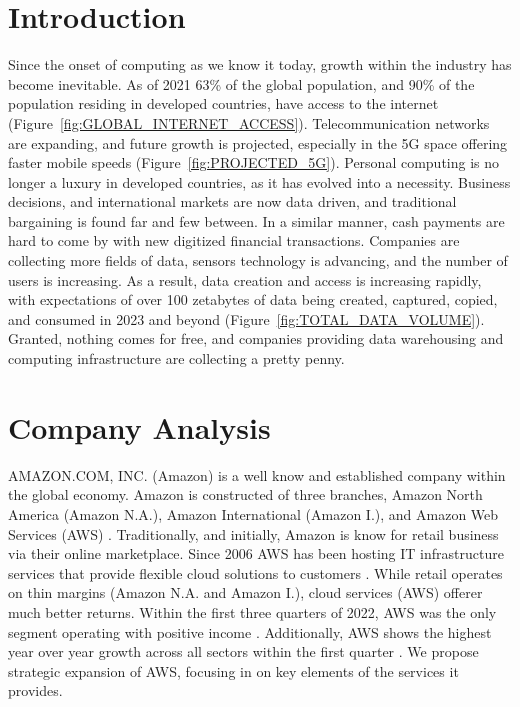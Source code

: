 \documentclass[a4paper, 12pt]{article}
\begin{document}
\newpage

\tableofcontents
\newpage

\section{Introduction}
Since the onset of computing as we know it today, growth within the industry has become inevitable.
As of 2021 63\% of the global population, and 90\% of the population residing in developed countries, have access to the internet (Figure~\ref{fig:GLOBAL_INTERNET_ACCESS}).
Telecommunication networks are expanding, and future growth is projected, especially in the 5G space offering faster mobile speeds (Figure~\ref{fig:PROJECTED_5G}).
Personal computing is no longer a luxury in developed countries, as it has evolved into a necessity.
Business decisions, and international markets are now data driven, and traditional bargaining is found far and few between.
In a similar manner, cash payments are hard to come by with new digitized financial transactions.
Companies are collecting more fields of data, sensors technology is advancing, and the number of users is increasing.
As a result, data creation and access is increasing rapidly, with expectations of over 100 zetabytes of data being created, captured, copied, and consumed in 2023 and beyond (Figure~\ref{fig:TOTAL_DATA_VOLUME}).
Granted, nothing comes for free, and companies providing data warehousing and computing infrastructure are collecting a pretty penny.

\section{Company Analysis}

AMAZON.COM, INC. (Amazon) is a well know and established company within the global economy.
Amazon is constructed of three branches, Amazon North America (Amazon N.A.), Amazon International (Amazon I.), and Amazon Web Services (AWS) \cite[p.~22]{AMZN_10K_2021}.
Traditionally, and initially, Amazon is know for retail business via their online marketplace.
Since 2006 AWS has been hosting IT infrastructure services that provide flexible cloud solutions to customers \cite{AMZN_ABOUT_AWS}.
While retail operates on thin margins (Amazon N.A. and Amazon I.), cloud services (AWS) offerer much better returns.
Within the first three quarters of 2022, AWS was the only segment operating with positive income \cite[p.~24, p.~19, p.~19]{AMZN_10Q_Q1_2022, AMZN_10Q_Q2_2022, AMZN_10Q_Q3_2022}.
Additionally, AWS shows the highest year over year growth across all sectors within the first quarter \cite[p.~23, p.~24, p.~24]{AMZN_10Q_Q1_2022, AMZN_10Q_Q2_2022, AMZN_10Q_Q3_2022}.
We propose strategic expansion of AWS, focusing in on key elements of the services it provides.
\end{document}
